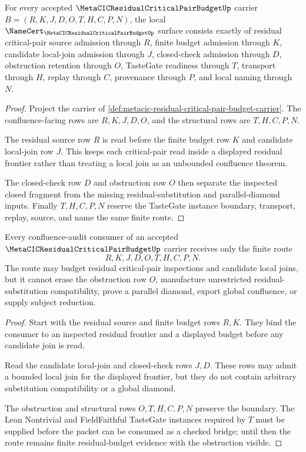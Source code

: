 \begin{theorem}
\label{thm:metacic-residual-critical-pair-budget-namecert-obligations}
For every accepted $\MetaCICResidualCriticalPairBudgetUp$ carrier $B=(R,K,J,D,O,T,H,C,P,N)$, the local $\NameCert_{\MetaCICResidualCriticalPairBudgetUp}$ surface consists exactly of residual critical-pair source admission through $R$, finite budget admission through $K$, candidate local-join admission through $J$, closed-check admission through $D$, obstruction retention through $O$, TasteGate readiness through $T$, transport through $H$, replay through $C$, provenance through $P$, and local naming through $N$.
\end{theorem}
\begin{proof}
Project the carrier of \autoref{def:metacic-residual-critical-pair-budget-carrier}. The confluence-facing rows are $R,K,J,D,O$, and the structural rows are $T,H,C,P,N$.

The residual source row $R$ is read before the finite budget row $K$ and candidate local-join row $J$. This keeps each critical-pair read inside a displayed residual frontier rather than treating a local join as an unbounded confluence theorem.

The closed-check row $D$ and obstruction row $O$ then separate the inspected closed fragment from the missing residual-substitution and parallel-diamond inputs. Finally $T,H,C,P,N$ reserve the TasteGate instance boundary, transport, replay, source, and name the same finite route.
\end{proof}

\begin{theorem}
\label{thm:metacic-residual-critical-pair-budget-boundary}
Every confluence-audit consumer of an accepted $\MetaCICResidualCriticalPairBudgetUp$ carrier receives only the finite route
$$
R,K,J,D,O,T,H,C,P,N .
$$
The route may budget residual critical-pair inspections and candidate local joins, but it cannot erase the obstruction row $O$, manufacture unrestricted residual-substitution compatibility, prove a parallel diamond, export global confluence, or supply subject reduction.
\end{theorem}
\begin{proof}
Start with the residual source and finite budget rows $R,K$. They bind the consumer to an inspected residual frontier and a displayed budget before any candidate join is read.

Read the candidate local-join and closed-check rows $J,D$. These rows may admit a bounded local join for the displayed frontier, but they do not contain arbitrary substitution compatibility or a global diamond.

The obstruction and structural rows $O,T,H,C,P,N$ preserve the boundary. The Lean Nontrivial and FieldFaithful TasteGate instances required by $T$ must be supplied before the packet can be consumed as a checked bridge; until then the route remains finite residual-budget evidence with the obstruction visible.
\end{proof}

